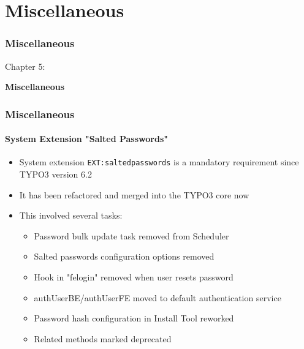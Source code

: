 %

\section{Miscellaneous}
\begin{frame}[fragile]
	\frametitle{Miscellaneous}

	\begin{center}\huge{Chapter 5:}\end{center}
	\begin{center}\huge{\color{typo3darkgrey}\textbf{Miscellaneous}}\end{center}

\end{frame}

%

\begin{frame}[fragile]
	\frametitle{Miscellaneous}
	\framesubtitle{System Extension "Salted Passwords"}

	\begin{itemize}
        \item System extension \texttt{EXT:saltedpasswords} is a mandatory
            requirement since TYPO3 version 6.2
		\item It has been refactored and merged into the TYPO3 core now

		\item This involved several tasks:

			\begin{itemize}
		        \item Password bulk update task removed from Scheduler
				\item Salted passwords configuration options removed
				\item Hook in "felogin" removed when user resets password
				\item authUserBE/authUserFE moved to default authentication service
				\item Password hash configuration in Install Tool reworked
				\item Related methods marked deprecated
			\end{itemize}

	\end{itemize}

\end{frame}

